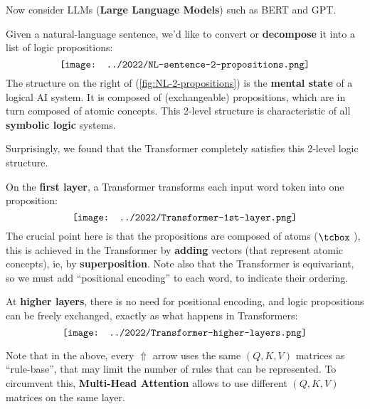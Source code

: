 \begin{preview}
\begin{minipage}{\textwidth}
Now consider LLMs (\textbf{Large Language Models}) such as BERT and GPT.

Given a natural-language sentence, we'd like to convert or \textbf{decompose} it into a list of logic propositions:
\begin{equation}
\label{fig:NL-2-propositions}
\vcenter{\hbox{\texttt{[image: ../2022/NL-sentence-2-propositions.png]}}}
\end{equation}
The structure on the right of (\ref{fig:NL-2-propositions}) is the \textbf{mental state} of a logical AI system.  It is composed of (exchangeable) propositions, which are in turn composed of atomic concepts.  This 2-level structure is characteristic of all \textbf{symbolic logic} systems.

Surprisingly, we found that the Transformer completely satisfies this 2-level logic structure.

On the \textbf{first layer}, a Transformer transforms each input word token into one proposition:
\begin{equation}
\vcenter{\hbox{\texttt{[image: ../2022/Transformer-1st-layer.png]}}}
\end{equation}
The crucial point here is that the propositions are composed of atoms ($\atom$), this is achieved in the Transformer by \textbf{adding} vectors (that represent atomic concepts), ie, by \textbf{superposition}.  Note also that the Transformer is equivariant, so we must add ``positional encoding'' to each word, to indicate their ordering.

At \textbf{higher layers}, there is no need for positional encoding, and logic propositions can be freely exchanged, exactly as what happens in Transformers:
\begin{equation}
\vcenter{\hbox{\texttt{[image: ../2022/Transformer-higher-layers.png]}}}
\end{equation}

Note that in the above, every $\Uparrow$ arrow uses the same $(Q,K,V)$ matrices as ``rule-base'', that may limit the number of rules that can be represented.  To circumvent this, \textbf{Multi-Head Attention} allows to use different $(Q,K,V)$ matrices on the same layer.

\end{minipage}
\end{preview}

\begin{comment}
\begin{preview}
\begin{minipage}{\textwidth}
\setlength{\parskip}{0.4\baselineskip}

\begin{textblock*}{20cm}(2.1cm,2cm) %
	{\color{red}{\large \textcircled{\small 2}}}
	\hspace{8cm}
	\color{blue}{\footnotesize \cc{逻辑 Transformer}{Logic Transformer}}
\end{textblock*}
\vspace*{0.3cm} 

\end{minipage}
\end{preview}
\end{comment}


